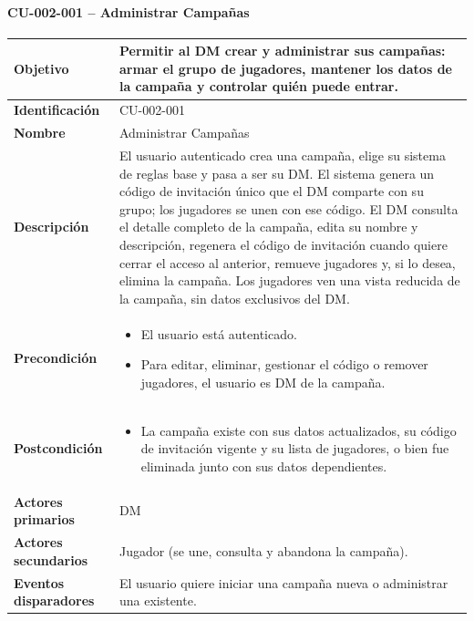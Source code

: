 \paragraph{CU-002-001 -- Administrar Campañas}
{\small\setlength{\tabcolsep}{5pt}\renewcommand{\arraystretch}{1.2}
\begin{longtable}{|>{\raggedright\arraybackslash\bfseries}p{3.2cm}|>{\raggedright\arraybackslash}p{11.9cm}|}
\hline
Objetivo & Permitir al DM crear y administrar sus campañas: armar el grupo de jugadores, mantener los datos de la campaña y controlar quién puede entrar. \\ \hline
Identificación & CU-002-001 \\ \hline
Nombre & Administrar Campañas \\ \hline
Descripción & El usuario autenticado crea una campaña, elige su sistema de reglas base y pasa a ser su DM. El sistema genera un código de invitación único que el DM comparte con su grupo; los jugadores se unen con ese código. El DM consulta el detalle completo de la campaña, edita su nombre y descripción, regenera el código de invitación cuando quiere cerrar el acceso al anterior, remueve jugadores y, si lo desea, elimina la campaña. Los jugadores ven una vista reducida de la campaña, sin datos exclusivos del DM. \\ \hline
Precondición & \begin{itemize}[itemsep=2pt,topsep=2pt]
\item El usuario está autenticado.
\item Para editar, eliminar, gestionar el código o remover jugadores, el usuario es DM de la campaña.
\end{itemize} \\ \hline
Postcondición & \begin{itemize}[itemsep=2pt,topsep=2pt]
\item La campaña existe con sus datos actualizados, su código de invitación vigente y su lista de jugadores, o bien fue eliminada junto con sus datos dependientes.
\end{itemize} \\ \hline
Actores primarios & DM \\ \hline
Actores secundarios & Jugador (se une, consulta y abandona la campaña). \\ \hline
Eventos disparadores & El usuario quiere iniciar una campaña nueva o administrar una existente. \\ \hline

\end{longtable}}
